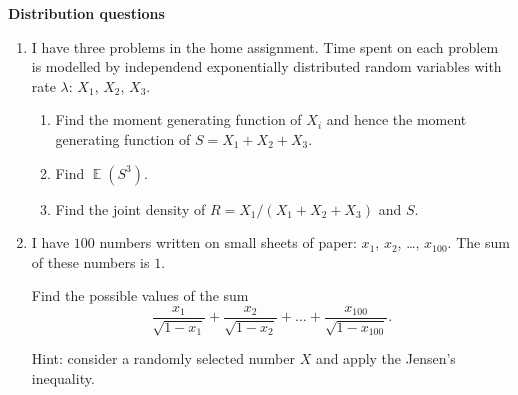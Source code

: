 \documentclass[12pt]{article}
\DeclareMathOperator{\E}{\mathbb{E}}
\begin{document}
\newpage
    \textbf{Distribution questions}

    \begin{enumerate}[resume]
    \item I have three problems in the home assignment. 
    Time spent on each problem is modelled by independend exponentially distributed random variables with rate $\lambda$: $X_1$, $X_2$, $X_3$.

    \begin{enumerate}
        \item Find the moment generating function of $X_i$ and hence the moment generating function of $S = X_1 + X_2 + X_3$.
        \item Find $\E(S^3)$.
        \item Find the joint density of $R = X_1 / (X_1 + X_2 + X_3)$ and $S$.
    \end{enumerate}

    \item I have $100$ numbers written on small sheets of paper: $x_1$, $x_2$, \ldots, $x_{100}$. The sum of these numbers is $1$. 
    
    Find the possible values of the sum 
    \[
    \frac{x_1}{\sqrt{1-x_1}} +     \frac{x_2}{\sqrt{1-x_2}} + \ldots + \frac{x_{100}}{\sqrt{1-x_{100}}}.
    \]
    

    Hint: consider a randomly selected number $X$ and apply the Jensen's inequality.
    
 
\end{enumerate}
\end{document}
